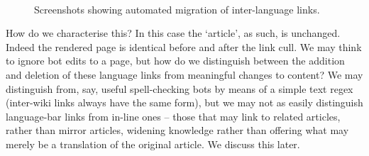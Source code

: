 \begin{figure}
  \centering {}\\ 
  \vspace{8mm}
\caption{Screenshots showing automated migration of inter-language
  links.}
\label{fig:traj-bot-explanation}
\end{figure}

How do we characterise this? In this case the `article', as such, is
unchanged. Indeed the rendered page is identical before and after the
link cull. We may think to ignore bot edits to a page, but how do we
distinguish between the addition and deletion of these language links
from meaningful changes to content? We may distinguish from, say,
useful spell-checking bots by means of a simple text regex (inter-wiki
links always have the same form), but we may not as easily distinguish
language-bar links from in-line ones -- those that may link to related
articles, rather than mirror articles, widening knowledge rather than
offering what may merely be a translation of the original
article. We discuss this later.

